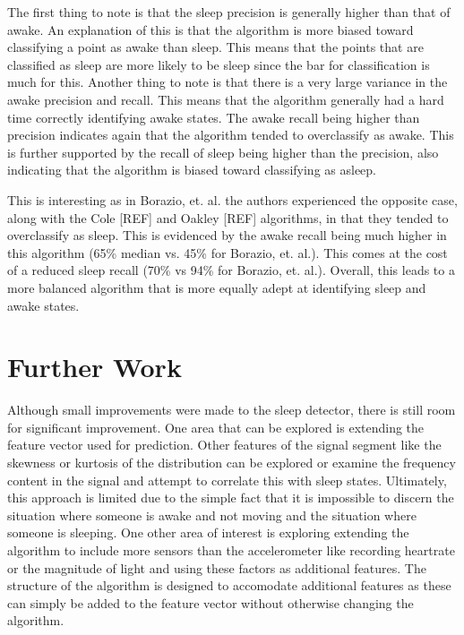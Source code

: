             The first thing to note is that the sleep precision is generally higher than that of awake. An explanation of this is that the algorithm is more biased toward classifying a point as awake than sleep. This means that the points that are classified as sleep are more likely to be sleep since the bar for classification is much for this. Another thing to note is that there is a very large variance in the awake precision and recall. This means that the algorithm generally had a hard time correctly identifying awake states. The awake recall being higher than precision indicates again that the algorithm tended to overclassify as awake. This is further supported by the recall of sleep being higher than the precision, also indicating that the algorithm is biased toward classifying as asleep. 

            This is interesting as in Borazio, et. al. the authors experienced the opposite case, along with the Cole [REF] and Oakley [REF] algorithms, in that they tended to overclassify as sleep. This is evidenced by the awake recall being much higher in this algorithm (65\% median vs. 45\% for Borazio, et. al.). This comes at the cost of a reduced sleep recall (70\% vs 94\% for Borazio, et. al.). Overall, this leads to a more balanced algorithm that is more equally adept at identifying sleep and awake states.


    \chapter{Further Work}

        Although small improvements were made to the sleep detector, there is still room for significant improvement. One area that can be explored is extending the feature vector used for prediction. Other features of the signal segment like the skewness or kurtosis of the distribution can be explored or examine the frequency content in the signal and attempt to correlate this with sleep states. Ultimately, this approach is limited due to the simple fact that it is impossible to discern the situation where someone is awake and not moving and the situation where someone is sleeping. One other area of interest is exploring extending the algorithm to include more sensors than the accelerometer like recording heartrate or the magnitude of light and using these factors as additional features. The structure of the algorithm is designed to accomodate additional features as these can simply be added to the feature vector without otherwise changing the algorithm.